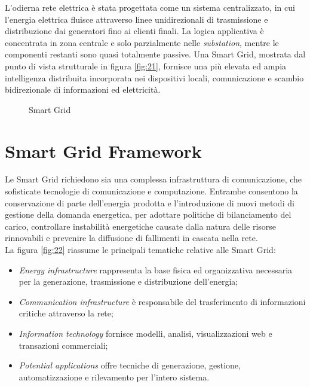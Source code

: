 L'odierna rete elettrica è stata progettata come un sistema centralizzato, in cui l'energia elettrica fluisce attraverso linee unidirezionali di trasmissione e distribuzione dai generatori fino ai clienti finali. La logica applicativa è concentrata in zona centrale e solo parzialmente nelle \emph{substation}, mentre le componenti restanti sono quasi totalmente passive. Una Smart Grid, mostrata dal punto di vista strutturale in figura \ref{fig:21}, fornisce una più elevata ed ampia intelligenza distribuita incorporata nei dispositivi locali, comunicazione e scambio bidirezionale di informazioni ed elettricità.

\begin{figure}[h] 
\caption{Smart Grid}\label{fig:2_1}
\end{figure}

\section{Smart Grid Framework}
Le Smart Grid richiedono sia una complessa infrastruttura di comunicazione, che sofisticate tecnologie di comunicazione e computazione. Entrambe consentono la conservazione di parte dell'energia prodotta e l'introduzione di nuovi metodi di gestione della domanda energetica, per adottare politiche di bilanciamento del carico, controllare instabilità energetiche causate dalla natura delle risorse rinnovabili e prevenire la diffusione di fallimenti in cascata nella rete. 
\\ 
La figura \ref{fig:22} riassume le principali tematiche relative alle Smart Grid:
\begin{itemize}
	\item \emph{Energy infrastructure} rappresenta la base fisica ed organizzativa necessaria per la generazione, trasmissione e distribuzione dell'energia;
	\item \emph{Communication infrastructure} è responsabile del trasferimento di informazioni critiche attraverso la rete;
	\item \emph{Information technology} fornisce modelli, analisi, visualizzazioni web e transazioni commerciali;
	\item \emph{Potential applications} offre tecniche di generazione, gestione, automatizzazione e rilevamento per l'intero sistema.
\end{itemize} 

